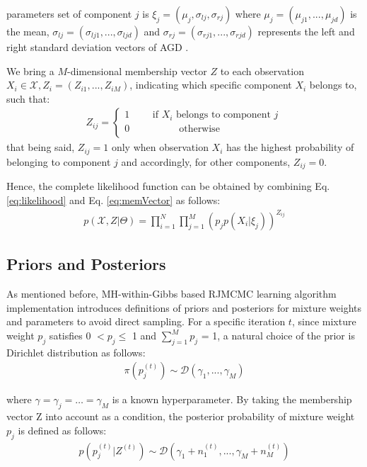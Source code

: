 \documentclass[conference]{IEEEtran}
\begin{document}
parameters set of component $j$ is $\xi_j = (\mu_j,\sigma_{lj},\sigma_{rj})$ where $\mu_j = (\mu_{j1},...,\mu_{jd})$ is the mean, $\sigma_{lj} = (\sigma_{lj1},...,\sigma_{ljd})$ and $\sigma_{rj} = (\sigma_{rj1},...,\sigma_{rjd})$ represents the left and right standard deviation vectors of AGD . 

We bring a $M$-dimensional membership vector $Z$ to each observation $X_i\in\mathcal{X}, Z_i = (Z_{i1},...,Z_{iM})$, indicating which specific component $X_i$ belongs to\cite{Bouguila2006}, such that:
\begin{align}
Z_{ij} = \left\{\begin{matrix}
1\qquad\mbox{ if }X_i\mbox{  belongs to component }j \\
0\qquad\quad\qquad \mbox{otherwise} \qquad\qquad\quad\quad \\
\end{matrix}\right.
\label{eq:memVector}
\end{align}
that being said, $Z_{ij} = 1$ only when observation $X_i$ has the highest probability of belonging to component $j$ and accordingly, for other components, $Z_{ij} = 0$. 

Hence, the complete likelihood function can be obtained by combining Eq. \eqref{eq:likelihood} and Eq. \eqref{eq:memVector} as follows:
\begin{align}
p(\mathcal{X}, Z|\Theta) = \prod_{i=1}^{N}\prod_{j=1}^{M}(p_jp(X_i|\xi_j))^{Z_{ij}}
\label{eq:compPdf}
\end{align}


\subsection{Priors and Posteriors}
As mentioned before, MH-within-Gibbs based RJMCMC learning algorithm implementation introduces definitions of priors and posteriors for mixture weights and parameters to avoid direct sampling. For a specific iteration $t$, since mixture weight $p_j$ satisfies 0 $< p_j \leq$ 1 and $\sum_{j=1}^Mp_j$ = 1, a natural choice of the prior is Dirichlet distribution\cite{Elguebaly2013} as follows:
\begin{align}
\pi(p_j^{(t)}) \sim \mathcal{D}(\gamma_1,...,\gamma_M )
\label{eq:priorWeight}
\end{align}

where $\gamma = \gamma_j = \dots = \gamma_M$ is a known hyperparameter. By taking the membership vector Z into account as a condition, the posterior probability of mixture weight $p_j$ is defined as follows:
\begin{align}
p(p_j^{(t)}|Z^{(t)}) \sim \mathcal{D}(\gamma_1 + n_1^{(t)},...,\gamma_M + n_M^{(t)})
\label{eq:posterWeight}
\end{align}
\end{document}

